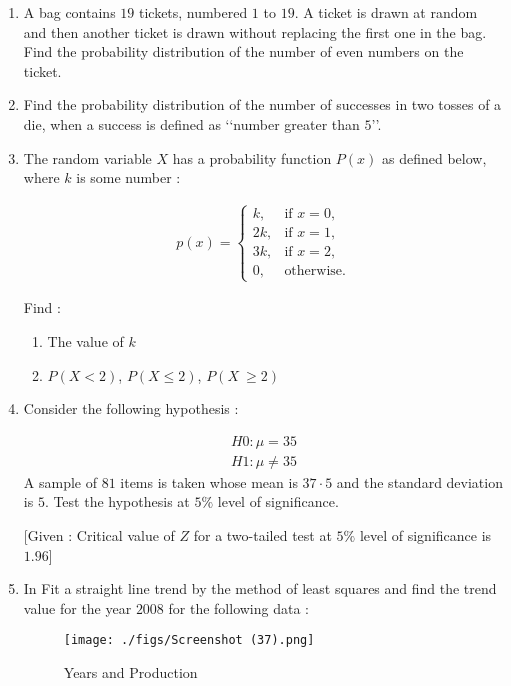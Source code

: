 \documentclass{article}
\theoremstyle{remark}
\begin{document}
\begin{enumerate}[label=\arabic*.,ref=\theenumi]
\item A bag contains $19$ tickets, numbered $1$ to $19$. A ticket is drawn at random 
and then another ticket is drawn without replacing the first one in the 
bag. Find the probability distribution of the number of even numbers on 
the ticket.

\item Find the probability distribution of the number of successes in two tosses 
of a die, when a success is defined as ‘‘number greater than $5$’’.

\item The random variable $X$ has a probability function $P(x)$ as defined below, 
where $k$ is some number :

\begin{align}
    p(x) = \begin{cases}
        k, & \text{if } x = 0, \\
        2k, & \text{if } x = 1, \\
        3k, & \text{if } x = 2, \\
        0, & \text{otherwise.}
    \end{cases}
\end{align}

Find :
\begin{enumerate}[label=(\roman*)]
 \item The value of $k$
 
 \item $P(X < 2)$, $P(X \leq 2)$, $P(X\ \geq 2)$
 
 \end{enumerate}

\item Consider the following hypothesis :

\begin {align}
H0 : \mu =  35\\
H1 : \mu \neq 35
\end{align}
A sample of $81$ items is taken whose mean is $37·5$ and the standard deviation is $5$. Test the hypothesis at $5\%$ level of significance.

[Given : Critical value of $Z$ for a two-tailed test at $5\%$ level of significance is $1.96$]

\item In  Fit a straight line trend by the method of least squares and find the trend 
value for the year $2008$ for the following data :

\begin{figure}[H]
        \centering
        \texttt{[image: ./figs/Screenshot (37).png]}
        \caption{Years and Production}
        \label{fig:fig6.png}
    \end{figure}
\end{enumerate}
\end{document}
